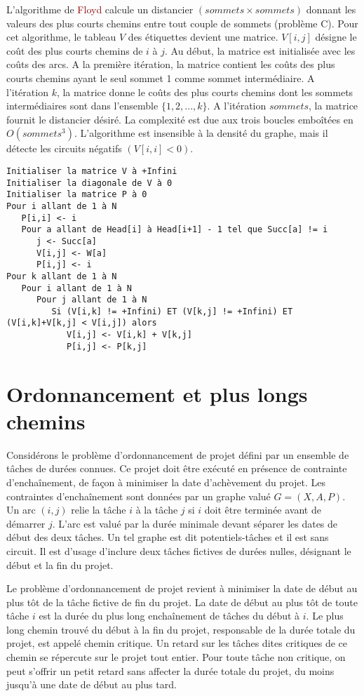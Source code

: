 \documentclass{article}
\newcommand{\red}[1]{\textcolor{darkred}{#1}}
\begin{document}
L’algorithme de \red{Floyd} calcule un distancier $(sommets \times sommets)$ donnant les valeurs des plus courts chemins entre tout couple de sommets (problème C). Pour cet 
algorithme, le tableau $V$ des étiquettes devient une matrice. $V[i,j]$ désigne le coût des plus courts chemins de $i$ à $j$. Au début, la matrice est initialisée avec les coûts des 
arcs. A la première itération, la matrice contient les coûts des plus courts chemins ayant le seul sommet 1 comme sommet intermédiaire. A l’itération $k$, la matrice donne le coûts 
des plus courts chemins dont les sommets intermédiaires sont dans l’ensemble $\{1,2,...,k\}$. A l’itération $sommets$, la matrice fournit le distancier désiré. La complexité est due 
aux trois boucles emboîtées en $O(sommets^3)$. L’algorithme est insensible à la densité du graphe, mais il détecte les circuits négatifs $(V[i,i]<0)$.
\begin{verbatim}
Initialiser la matrice V à +Infini
Initialiser la diagonale de V à 0
Initialiser la matrice P à 0
Pour i allant de 1 à N
   P[i,i] <- i
   Pour a allant de Head[i] à Head[i+1] - 1 tel que Succ[a] != i
      j <- Succ[a]
      V[i,j] <- W[a]
      P[i,j] <- i
Pour k allant de 1 à N
   Pour i allant de 1 à N
      Pour j allant de 1 à N
         Si (V[i,k] != +Infini) ET (V[k,j] != +Infini) ET (V[i,k]+V[k,j] < V[i,j]) alors
            V[i,j] <- V[i,k] + V[k,j]
            P[i,j] <- P[k,j]
\end{verbatim}

\section{Ordonnancement et plus longs chemins}

Considérons le problème d’ordonnancement de projet défini par un ensemble de tâches de durées connues. Ce projet doit être exécuté en présence de contrainte d’enchaînement, de 
façon à minimiser la date d’achèvement du projet. Les contraintes d’enchaînement sont données par un graphe valué $G=(X,A,P)$. Un arc $(i,j)$ relie la tâche $i$ à la tâche $j$ si 
$i$ doit être terminée avant de démarrer $j$. L’arc est valué par la durée minimale devant séparer les dates de début des deux tâches. Un tel graphe est dit potentiels-tâches et il 
est sans circuit. Il est d’usage d’inclure deux tâches fictives de durées nulles, désignant le début et la fin du projet.

Le problème d’ordonnancement de projet revient à minimiser la date de début au plus tôt de la tâche fictive de fin du projet. La date de début au plus tôt de toute tâche $i$ est la 
durée du plus long enchaînement de tâches du début à $i$. Le plus long chemin trouvé du début à la fin du projet, responsable de la durée totale du projet, est appelé chemin 
critique. Un retard sur les tâches dites critiques de ce chemin se répercute sur le projet tout entier. Pour toute tâche non critique, on peut s’offrir un petit retard sans
affecter la durée totale du projet, du moins jusqu’à une date de début au plus tard.
\end{document}
